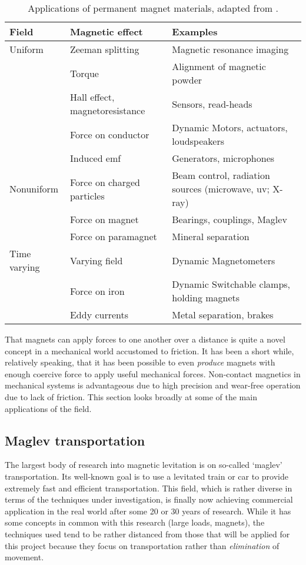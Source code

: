 \begin{table}
\begin{tabular}{@{}lll@{}}
\toprule
Field & Magnetic effect & Examples \\
\midrule
Uniform & Zeeman splitting & Magnetic resonance imaging \\
& Torque & Alignment of magnetic powder \\
& Hall effect, magnetoresistance & Sensors, read-heads \\
& Force on conductor & Dynamic Motors, actuators, loudspeakers \\
& Induced emf & Generators, microphones \\
Nonuniform & Force on charged particles & Beam control, 
radiation sources (microwave, uv; X-ray) \\
& Force on magnet & Bearings, couplings, Maglev \\
& Force on paramagnet & Mineral separation \\
Time varying & Varying field & Dynamic Magnetometers \\
& Force on iron & Dynamic Switchable clamps, holding magnets \\
& Eddy currents & Metal separation, brakes \\
\bottomrule
\end{tabular}
\caption{Applications of permanent magnet materials, 
adapted from \textcite{coey2002}.}
\end{table}


That magnets can apply forces to one another over a distance is
quite a novel concept in a mechanical world accustomed to
friction. It has been a short while, relatively speaking, that
it has been possible to even \emph{produce} magnets with enough
coercive force to apply useful mechanical forces. Non-contact
magnetics in mechanical systems is advantageous due to high
precision and wear-free operation due to lack of friction. This
section looks broadly at some of the main applications of the
field.

\subsection{Maglev transportation}

The largest body of research into magnetic levitation is on
so-called `maglev' transportation. Its well-known goal is to
use a levitated train or car to provide extremely fast and
efficient transportation. This field, which is rather diverse
in terms of the techniques under investigation, is finally now
achieving commercial application in the real world after some
20 or 30 years of research.  While it has some concepts in
common with this research (large loads, magnets), the
techniques used tend to be rather distanced from those that
will be applied for this project because they focus on
transportation rather than \emph{elimination} of movement.


